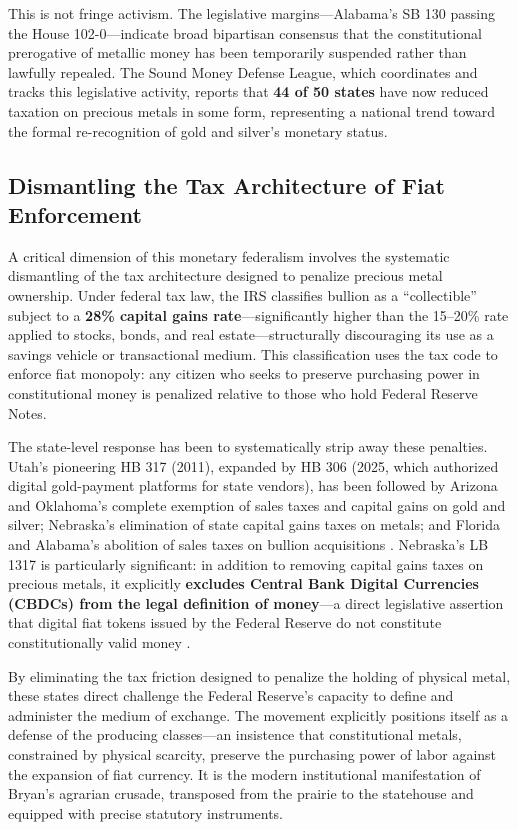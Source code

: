 \documentclass[
]{article}
\begin{document}
This is not fringe activism. The legislative margins---Alabama's SB 130
passing the House 102-0---indicate broad bipartisan consensus that the
constitutional prerogative of metallic money has been temporarily
suspended rather than lawfully repealed. The Sound Money Defense League,
which coordinates and tracks this legislative activity, reports that
\textbf{44 of 50 states} have now reduced taxation on precious metals in
some form, representing a national trend toward the formal
re-recognition of gold and silver's monetary status.

\subsection{Dismantling the Tax Architecture of Fiat
Enforcement}\label{dismantling-the-tax-architecture-of-fiat-enforcement}

A critical dimension of this monetary federalism involves the systematic
dismantling of the tax architecture designed to penalize precious metal
ownership. Under federal tax law, the IRS classifies bullion as a
``collectible'' subject to a \textbf{28\% capital gains
rate}---significantly higher than the 15--20\% rate applied to stocks,
bonds, and real estate---structurally discouraging its use as a savings
vehicle or transactional medium. This classification uses the tax code
to enforce fiat monopoly: any citizen who seeks to preserve purchasing
power in constitutional money is penalized relative to those who hold
Federal Reserve Notes.

The state-level response has been to systematically strip away these
penalties. Utah's pioneering HB 317 (2011), expanded by HB 306 (2025,
which authorized digital gold-payment platforms for state vendors), has
been followed by Arizona and Oklahoma's complete exemption of sales
taxes and capital gains on gold and silver; Nebraska's elimination of
state capital gains taxes on metals; and Florida and Alabama's abolition
of sales taxes on bullion acquisitions
\citep{utah2011legal, florida2025legaltender, alabama2026legaltender, nebraska2026metals}.
Nebraska's LB 1317 is particularly significant: in addition to removing
capital gains taxes on precious metals, it explicitly \textbf{excludes
Central Bank Digital Currencies (CBDCs) from the legal definition of
money}---a direct legislative assertion that digital fiat tokens issued
by the Federal Reserve do not constitute constitutionally valid money
\citep{nebraska2026metals}.

By eliminating the tax friction designed to penalize the holding of
physical metal, these states direct challenge the Federal Reserve's
capacity to define and administer the medium of exchange. The movement
explicitly positions itself as a defense of the producing classes---an
insistence that constitutional metals, constrained by physical scarcity,
preserve the purchasing power of labor against the expansion of fiat
currency. It is the modern institutional manifestation of Bryan's
agrarian crusade, transposed from the prairie to the statehouse and
equipped with precise statutory instruments.
\end{document}
